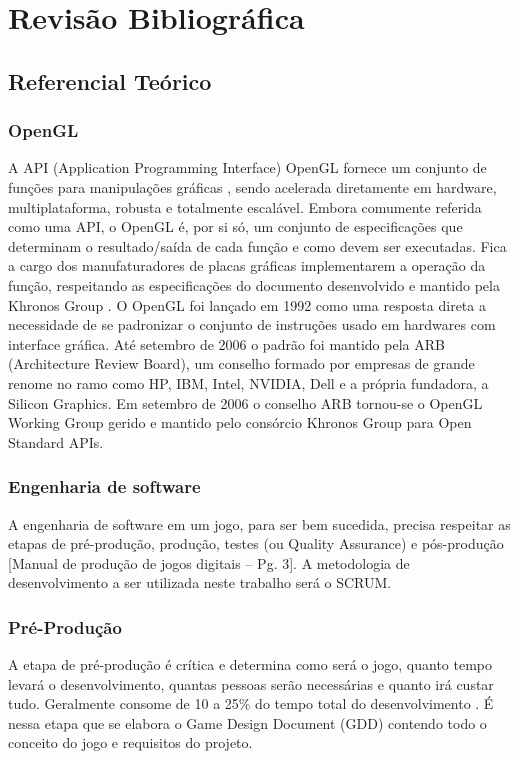 \documentclass[12pt, 
openright, 
oneside, 
a4paper,    
brazil]{facom-ufu-abntex2}
\begin{document}

\chapter{Revisão Bibliográfica}

\section{Referencial Teórico}
\label{sec:refteo}
\subsection{OpenGL}
A API (Application Programming Interface) OpenGL fornece um conjunto de funções para manipulações gráficas \cite{LearnOpenGL}, sendo acelerada diretamente em hardware, multiplataforma, robusta e totalmente escalável. Embora comumente referida como uma API, o OpenGL é, por si só, um conjunto de especificações que determinam o resultado/saída de cada função e como devem ser executadas. Fica a cargo dos manufaturadores de placas gráficas implementarem a operação da função, respeitando as especificações do documento desenvolvido e mantido pela Khronos Group \cite{KhronosOpenGLSpecification}.
 O OpenGL foi lançado em 1992 como uma resposta direta a necessidade de se padronizar o conjunto de instruções usado em hardwares com interface gráfica. Até setembro de 2006 o padrão foi mantido pela ARB (Architecture Review Board), um conselho formado por empresas de grande renome no ramo como HP, IBM, Intel, NVIDIA, Dell e a própria fundadora, a Silicon Graphics. Em setembro de 2006 o conselho ARB tornou-se o OpenGL Working Group gerido e mantido pelo consórcio Khronos Group para Open Standard APIs\cite{OpenGLAbout}.
 
\subsection{Engenharia de software}
A engenharia de software em um jogo, para ser bem sucedida, precisa respeitar as etapas de pré-produção, produção, testes (ou Quality Assurance) e pós-produção [Manual de produção de jogos digitais – Pg. 3]. A metodologia de desenvolvimento a ser utilizada neste trabalho será o SCRUM.

\subsection{Pré-Produção}
A etapa de pré-produção é crítica e determina como será o jogo, quanto tempo levará o desenvolvimento, quantas pessoas serão necessárias e quanto irá custar tudo. Geralmente consome de 10 a 25\% do tempo total do desenvolvimento \cite{Manualdejogosdigitais}. É nessa etapa que se elabora o Game Design Document (GDD) contendo todo o conceito do jogo e requisitos do projeto.
\end{document}
